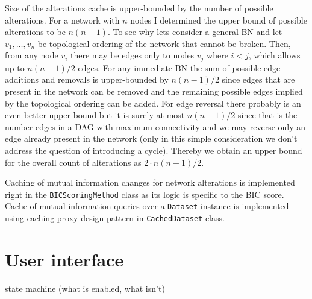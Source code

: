 \documentclass[english,cover]{fitthesis} %
\newcommand{\srccode}[1]{{\tt #1}}         %
\newcommand{\todo}[1]{{\color{red}#1}}
\begin{document}
Size of the alterations cache is upper-bounded by the number of possible alterations. For a network with $n$ nodes I determined the upper bound of possible alterations to be $n(n-1)$. To see why lets consider a general BN and let $v_1, \dots, v_n$ be topological ordering of the network that cannot be broken. Then, from any node $v_i$ there may be edges only to nodes $v_j$ where $i < j$, which allows up to $n(n-1)/2$ edges. For any immediate BN the sum of possible edge additions and removals is upper-bounded by $n(n-1)/2$ since edges that are present in the network can be removed and the remaining possible edges implied by the topological ordering can be added. For edge reversal there probably is an even better upper bound but it is surely at most $n(n-1)/2$ since that is the number edges in a DAG with maximum connectivity and we may reverse only an edge already present in the network (only in this simple consideration we don't address the question of introducing a cycle). Thereby we obtain an upper bound for the overall count of alterations as $2 \cdot n(n-1)/2$.

\medskip
Caching of mutual information changes for network alterations is implemented right in the \srccode{BICScoringMethod} class as its logic is specific to the BIC score. Cache of mutual information queries over a \srccode{Dataset} instance is implemented using caching proxy design pattern in \srccode{CachedDataset} class.




\section{User interface}

\todo{state machine (what is enabled, what isn't)}
\end{document}
